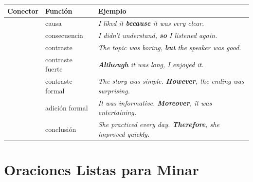 \documentclass[12pt,a4paper]{article}
\begin{document}
\begin{cajachunk}
\begin{tabularx}{\textwidth}{@{} l l X @{}}
\toprule
\textbf{Conector} & \textbf{Función} & \textbf{Ejemplo} \\
\midrule
\eng{because} & causa & \textit{I liked it \textbf{because} it was very clear.} \\
\eng{so} & consecuencia & \textit{I didn't understand, \textbf{so} I listened again.} \\
\eng{but} & contraste & \textit{The topic was boring, \textbf{but} the speaker was good.} \\
\eng{although} & contraste fuerte & \textit{\textbf{Although} it was long, I enjoyed it.} \\
\eng{however} & contraste formal & \textit{The story was simple. \textbf{However}, the ending was surprising.} \\
\eng{moreover} & adición formal & \textit{It was informative. \textbf{Moreover}, it was entertaining.} \\
\eng{therefore} & conclusión & \textit{She practiced every day. \textbf{Therefore}, she improved quickly.} \\
\bottomrule
\end{tabularx}
\end{cajachunk}

\section{Oraciones Listas para Minar}
\end{document}
